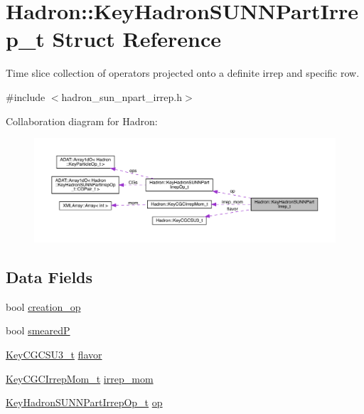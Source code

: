 \hypertarget{structHadron_1_1KeyHadronSUNNPartIrrep__t}{}\section{Hadron\+:\+:Key\+Hadron\+S\+U\+N\+N\+Part\+Irrep\+\_\+t Struct Reference}
\label{structHadron_1_1KeyHadronSUNNPartIrrep__t}


Time slice collection of operators projected onto a definite irrep and specific row.  




{\ttfamily \#include $<$hadron\+\_\+sun\+\_\+npart\+\_\+irrep.\+h$>$}



Collaboration diagram for Hadron\+:\nopagebreak
\begin{figure}[H]
\begin{center}
\leavevmode
\includegraphics[width=350pt]{d1/d94/structHadron_1_1KeyHadronSUNNPartIrrep__t__coll__graph}
\end{center}
\end{figure}
\subsection*{Data Fields}
\begin{DoxyCompactItemize}
\item 
bool \mbox{\hyperlink{structHadron_1_1KeyHadronSUNNPartIrrep__t_a604bdc5b651211fc5b3a8710aba24283}{creation\+\_\+op}}
\item 
bool \mbox{\hyperlink{structHadron_1_1KeyHadronSUNNPartIrrep__t_ae27b069e7cc2139fcf1e9e847c163f38}{smearedP}}
\item 
\mbox{\hyperlink{structHadron_1_1KeyCGCSU3__t}{Key\+C\+G\+C\+S\+U3\+\_\+t}} \mbox{\hyperlink{structHadron_1_1KeyHadronSUNNPartIrrep__t_a1afd6b50892d0d7c59591a512dad055e}{flavor}}
\item 
\mbox{\hyperlink{structHadron_1_1KeyCGCIrrepMom__t}{Key\+C\+G\+C\+Irrep\+Mom\+\_\+t}} \mbox{\hyperlink{structHadron_1_1KeyHadronSUNNPartIrrep__t_a15450b67952df088e68b35288947e2e4}{irrep\+\_\+mom}}
\item 
\mbox{\hyperlink{structHadron_1_1KeyHadronSUNNPartIrrepOp__t}{Key\+Hadron\+S\+U\+N\+N\+Part\+Irrep\+Op\+\_\+t}} \mbox{\hyperlink{structHadron_1_1KeyHadronSUNNPartIrrep__t_ae502e15ab768c7d2dd40b79672d0c0b0}{op}}
\end{DoxyCompactItemize}


